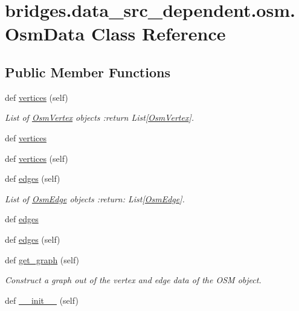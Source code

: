 \hypertarget{classbridges_1_1data__src__dependent_1_1osm_1_1_osm_data}{}\section{bridges.\+data\+\_\+src\+\_\+dependent.\+osm.\+Osm\+Data Class Reference}
\label{classbridges_1_1data__src__dependent_1_1osm_1_1_osm_data}
\subsection*{Public Member Functions}
\begin{DoxyCompactItemize}
\item 
def \hyperlink{classbridges_1_1data__src__dependent_1_1osm_1_1_osm_data_a9d254d1ef4043909d4d2bd4427daae39}{vertices} (self)
\begin{DoxyCompactList}\small\item\em List of \hyperlink{classbridges_1_1data__src__dependent_1_1osm_1_1_osm_vertex}{Osm\+Vertex} objects \+:return List\mbox{[}\hyperlink{classbridges_1_1data__src__dependent_1_1osm_1_1_osm_vertex}{Osm\+Vertex}\mbox{]}. \end{DoxyCompactList}\item 
def \hyperlink{classbridges_1_1data__src__dependent_1_1osm_1_1_osm_data_aaf96716b8b7e7c5810d8858cb3463a8d}{vertices}
\item 
def \hyperlink{classbridges_1_1data__src__dependent_1_1osm_1_1_osm_data_a9d254d1ef4043909d4d2bd4427daae39}{vertices} (self)
\item 
def \hyperlink{classbridges_1_1data__src__dependent_1_1osm_1_1_osm_data_a1ec1018524a570304e80fb662e266f12}{edges} (self)
\begin{DoxyCompactList}\small\item\em List of \hyperlink{classbridges_1_1data__src__dependent_1_1osm_1_1_osm_edge}{Osm\+Edge} objects \+:return\+: List\mbox{[}\hyperlink{classbridges_1_1data__src__dependent_1_1osm_1_1_osm_edge}{Osm\+Edge}\mbox{]}. \end{DoxyCompactList}\item 
def \hyperlink{classbridges_1_1data__src__dependent_1_1osm_1_1_osm_data_a9a25900d86edcef59c6635ffae2dc5c3}{edges}
\item 
def \hyperlink{classbridges_1_1data__src__dependent_1_1osm_1_1_osm_data_a1ec1018524a570304e80fb662e266f12}{edges} (self)
\item 
def \hyperlink{classbridges_1_1data__src__dependent_1_1osm_1_1_osm_data_a50b43937ae7d87ac21378ed100fce657}{get\+\_\+graph} (self)
\begin{DoxyCompactList}\small\item\em Construct a graph out of the vertex and edge data of the O\+SM object. \end{DoxyCompactList}\item 
def \hyperlink{classbridges_1_1data__src__dependent_1_1osm_1_1_osm_data_ab36ec2f4933157aed6c28a02b258afee}{\+\_\+\+\_\+init\+\_\+\+\_\+} (self)
\end{DoxyCompactItemize}

